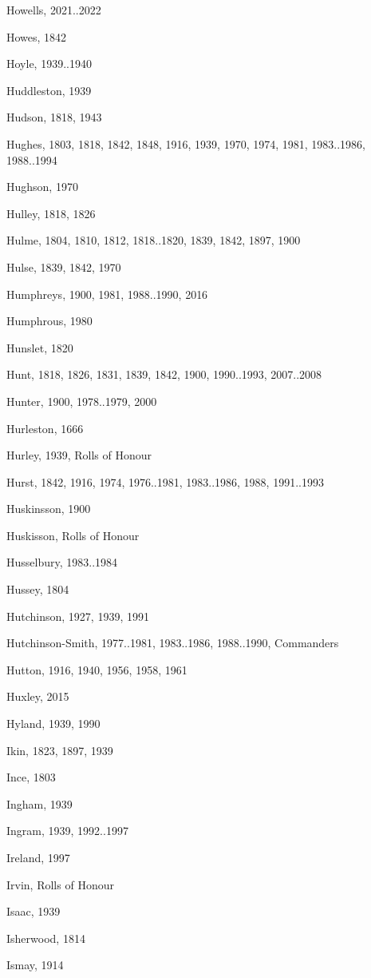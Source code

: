 \begin{theindex}
\item Howells, 2021..2022
\item Howes, 1842
\item Hoyle, 1939..1940
\item Huddleston, 1939
\item Hudson, 1818, 1943
\item Hughes, 1803, 1818, 1842, 1848, 1916, 1939, 1970, 1974, 1981, 1983..1986, 1988..1994
\item Hughson, 1970
\item Hulley, 1818, 1826
\item Hulme, 1804, 1810, 1812, 1818..1820, 1839, 1842, 1897, 1900
\item Hulse, 1839, 1842, 1970
\item Humphreys, 1900, 1981, 1988..1990, 2016
\item Humphrous, 1980
\item Hunslet, 1820
\item Hunt, 1818, 1826, 1831, 1839, 1842, 1900, 1990..1993, 2007..2008
\item Hunter, 1900, 1978..1979, 2000
\item Hurleston, 1666
\item Hurley, 1939, Rolls of Honour
\item Hurst, 1842, 1916, 1974, 1976..1981, 1983..1986, 1988, 1991..1993
\item Huskinsson, 1900
\item Huskisson, Rolls of Honour
\item Husselbury, 1983..1984
\item Hussey, 1804
\item Hutchinson, 1927, 1939, 1991
\item Hutchinson-Smith, 1977..1981, 1983..1986, 1988..1990, Commanders
\item Hutton, 1916, 1940, 1956, 1958, 1961
\item Huxley, 2015
\item Hyland, 1939, 1990
\item Ikin, 1823, 1897, 1939
\item Ince, 1803
\item Ingham, 1939
\item Ingram, 1939, 1992..1997
\item Ireland, 1997
\item Irvin, Rolls of Honour
\item Isaac, 1939
\item Isherwood, 1814
\item Ismay, 1914

\end{theindex}
